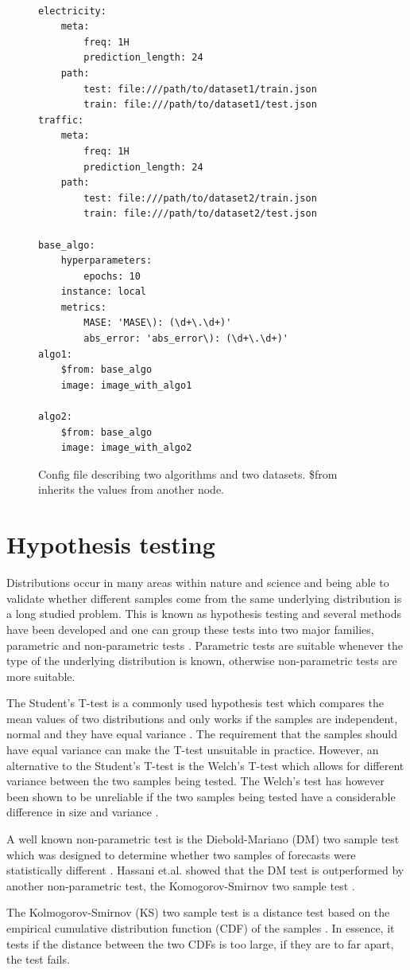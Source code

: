 \begin{figure}
  \begin{lstlisting}[]

electricity:
    meta:
        freq: 1H
        prediction_length: 24
    path:
        test: file:///path/to/dataset1/train.json
        train: file:///path/to/dataset1/test.json
traffic:
    meta:
        freq: 1H
        prediction_length: 24
    path:
        test: file:///path/to/dataset2/train.json
        train: file:///path/to/dataset2/test.json

base_algo:
    hyperparameters:
        epochs: 10
    instance: local
    metrics: 
        MASE: 'MASE\): (\d+\.\d+)'
        abs_error: 'abs_error\): (\d+\.\d+)'
algo1:
    $from: base_algo
    image: image_with_algo1

algo2:
    $from: base_algo
    image: image_with_algo2

\end{lstlisting}
  \caption{Config file describing two algorithms and two datasets. \$from inherits the values from another node.}
  \label{fig:example_config}
\end{figure}
\clearpage


\section{Hypothesis testing}
\label{sec:hypothesis_tests}
Distributions occur in many areas within nature and science and being able to validate whether different samples come from the same underlying distribution is a long studied problem.  This is known as hypothesis testing and several methods have been developed and one can group these tests into two major families, parametric and non-parametric tests \cite{kim2015t}. Parametric tests are suitable whenever the type of the underlying distribution is known, otherwise non-parametric tests are more suitable.

The Student's T-test is a commonly used hypothesis test which compares the mean values of two distributions and only works if the samples are independent, normal and they have equal variance \cite{kim2015t}. The requirement that the samples should have equal variance can make the T-test unsuitable in practice. However, an alternative to the Student's T-test is the Welch’s T-test which allows for different variance between the two samples being tested. The Welch’s test has however been shown to be unreliable if the two samples being tested have a considerable difference in size and variance \cite{student_or_welch}.

A well known non-parametric test is the Diebold-Mariano (DM) two sample test which was designed to determine whether two samples of forecasts were statistically different \cite{diebold2015comparing}. Hassani et.al. showed that the DM test is outperformed by another non-parametric test, the Komogorov-Smirnov two sample test \cite{hassani2015kolmogorov}.

The Kolmogorov-Smirnov (KS) two sample test is a distance test based on the empirical cumulative distribution function (CDF) of the samples \cite{massey1951kolmogorov}. In essence, it tests if the distance between the two CDFs is too large, if they are to far apart, the test fails.

